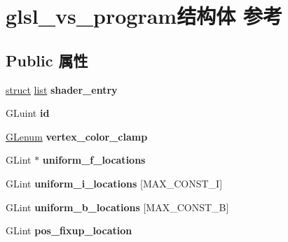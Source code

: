 \hypertarget{structglsl__vs__program}{}\section{glsl\+\_\+vs\+\_\+program结构体 参考}
\label{structglsl__vs__program}
\subsection*{Public 属性}
\begin{DoxyCompactItemize}
\item 
\mbox{\label{structglsl__vs__program_a1eb5b8b3e6e978b28b2a62ddea9046f9}} 
\hyperlink{interfacestruct}{struct} \hyperlink{classlist}{list} {\bfseries shader\+\_\+entry}
\item 
\mbox{\label{structglsl__vs__program_a5fac747df478fd6defd5b4b15eabbb8e}} 
G\+Luint {\bfseries id}
\item 
\mbox{\label{structglsl__vs__program_a8aa4b7d09f14da6c0e2d0d3d0aca0ad7}} 
\hyperlink{interfacevoid}{G\+Lenum} {\bfseries vertex\+\_\+color\+\_\+clamp}
\item 
\mbox{\label{structglsl__vs__program_a0205570b423e1400ee95d53fb4b45652}} 
G\+Lint $\ast$ {\bfseries uniform\+\_\+f\+\_\+locations}
\item 
\mbox{\label{structglsl__vs__program_a0717d971f62084ae1287e5a41f9986e0}} 
G\+Lint {\bfseries uniform\+\_\+i\+\_\+locations} \mbox{[}M\+A\+X\+\_\+\+C\+O\+N\+S\+T\+\_\+I\mbox{]}
\item 
\mbox{\label{structglsl__vs__program_a3a09b1dda81cee40abd2d5b4a0eb4155}} 
G\+Lint {\bfseries uniform\+\_\+b\+\_\+locations} \mbox{[}M\+A\+X\+\_\+\+C\+O\+N\+S\+T\+\_\+B\mbox{]}
\item 
\mbox{\label{structglsl__vs__program_af83bdd6e611bf53f5ef0174365b6f675}} 
G\+Lint {\bfseries pos\+\_\+fixup\+\_\+location}
\item 
\mbox{\label{structglsl__vs__program_afdb762267f01a34ad2ba37878199e8b9}} 

\end{DoxyCompactItemize}

